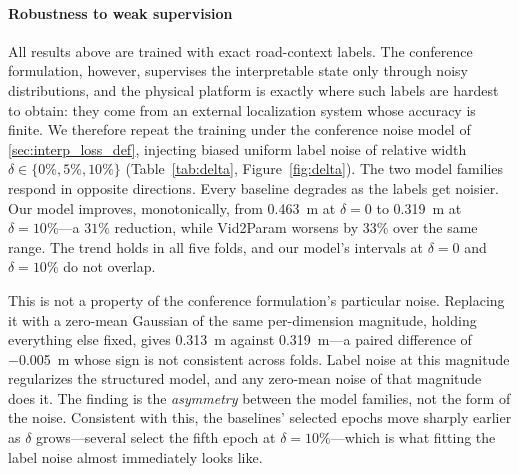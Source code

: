\documentclass[preprint,12pt]{elsarticle}
\begin{document}
\paragraph{Robustness to weak supervision}
All results above are trained with exact road-context labels.
The conference formulation, however, supervises the interpretable state only
through noisy distributions, and the physical platform is exactly where such
labels are hardest to obtain: they come from an external localization system whose
accuracy is finite.
We therefore repeat the training under the conference noise model of
\ref{sec:interp_loss_def}, injecting biased uniform label noise of
relative width $\delta \in \{0\%, 5\%, 10\%\}$
(Table~\ref{tab:delta}, Figure~\ref{fig:delta}).
The two model families respond in opposite directions. Every baseline degrades as
the labels get noisier. Our model improves, monotonically, from \SI{0.463}{m} at
$\delta = 0$ to \SI{0.319}{m} at $\delta = 10\%$---a $31\%$ reduction, while
Vid2Param worsens by $33\%$ over the same range. The trend holds in all five folds,
and our model's intervals at $\delta = 0$ and $\delta = 10\%$ do not overlap.

This is not a property of the conference formulation's particular noise.
Replacing it with a zero-mean Gaussian of the same per-dimension magnitude,
holding everything else fixed, gives \SI{0.313}{m} against \SI{0.319}{m}---a paired
difference of \SI{-0.005}{m} whose sign is not consistent across folds. Label noise
at this magnitude regularizes the structured model, and any zero-mean noise of that
magnitude does it. The finding is the \emph{asymmetry} between the model families,
not the form of the noise. Consistent with this, the baselines' selected epochs move
sharply earlier as $\delta$ grows---several select the fifth epoch at $\delta =
10\%$---which is what fitting the label noise almost immediately looks like.
\end{document}
